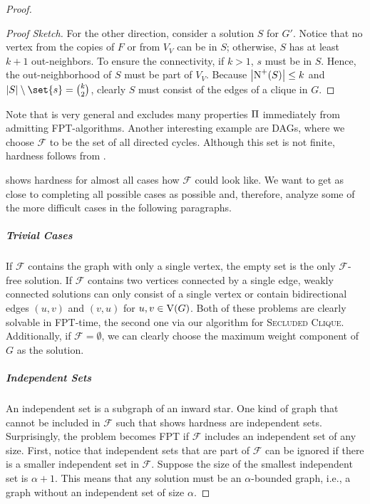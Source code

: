 \begin{proof}
\begin{proof}[Proof Sketch]
    For the other direction, consider a solution $S$ for $G'$. Notice that no vertex from the copies of $F$ or from $V_V$ can be in $S$; otherwise, $S$ has at least $k+1$ out-neighbors. To ensure the connectivity, if $k > 1$, $s$ must be in $S$. Hence, the out-neighborhood of $S$ must be part of $V_V$. Because $\abs{\outNei{S}} \le k$ and $\abs{S} \setminus \set{s} = \binom{k}{2}$, clearly $S$ must consist of the edges of a clique in $G$.
\fi
\end{proof}

Note that  is very general and excludes many properties $\operatorname{\Pi}$ immediately from admitting FPT-algorithms. %
Another interesting example are DAGs, where we choose $\mathcal{F}$ to be the set of all directed cycles. Although this set is not finite, hardness follows from .

\restatedag*

 shows hardness for almost all cases how $\mathcal{F}$ could look like. We want to get as close to completing all possible cases as possible and, therefore, analyze some of the more difficult cases in the following paragraphs.

\subparagraph*{Trivial Cases}
If $\mathcal{F}$ contains the graph with only a single vertex, the empty set is the only $\mathcal{F}$-free solution. If $\mathcal{F}$ contains two vertices connected by a single edge, weakly connected solutions can only consist of a single vertex or contain bidirectional edges $(u,v)$ and $(v,u)$ for $u,v \in \operatorname{V}({G})$. Both of these problems are clearly solvable in FPT-time, the second one via our algorithm for \textsc{Secluded Clique}. Additionally, if $\mathcal{F} = \emptyset$, we can clearly choose the maximum weight component of $G$ as the solution.

\subparagraph*{Independent Sets} 
An independent set is a subgraph of an inward star. One kind of graph that cannot be included in $\mathcal{F}$ such that  shows hardness are independent sets. Surprisingly, the problem becomes FPT if $\mathcal{F}$ includes an independent set of any size. First, notice that independent sets that are part of $\mathcal{F}$ can be ignored if there is a smaller independent set in $\mathcal{F}$. Suppose the size of the smallest independent set is $\alpha+1$. This means that any solution must be an $\alpha$-bounded graph, i.e., a graph without an independent set of size $\alpha$.


\end{proof}
